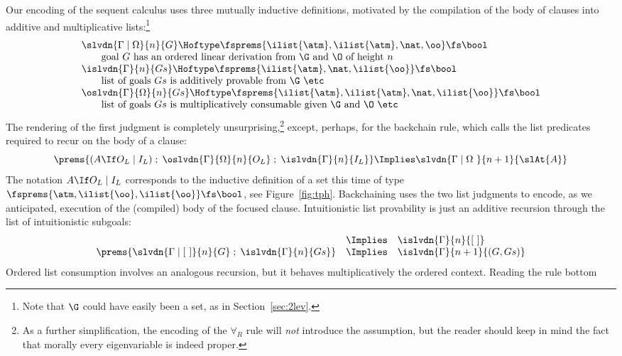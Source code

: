 \documentclass[final]{svjour3}
\begin{document}
Our encoding of the \ollim sequent calculus 
uses three mutually inductive definitions,
motivated by the compilation of the body of clauses into additive and
multiplicative lists:\footnote{Note that $\G$ could have easily been a
set, as in Section~\ref{sec:2lev}.}
\[\begin{array}{l}
  \slvdn{\Gamma\coln\Omega}{n }{G} \Hoftype
  \fsprems{\ilist{\atm},\ilist{\atm}, \nat,\oo}\fs\bool\\
 \qquad\mbox{goal $G$ has an ordered linear derivation from $\G$ and
    $\O$ of height $n$}\\
  \islvdn{\Gamma}{n}{Gs} \Hoftype
  \fsprems{\ilist{\atm}, \nat,\ilist{\oo}}\fs\bool\\
\qquad\mbox{list
    of goals $Gs$ is additively provable from $\G$ \etc}\\  
  \oslvdn{\Gamma}{\Omega}{n}{Gs}\Hoftype
  \fsprems{\ilist{\atm},\ilist{\atm}, \nat,\ilist{\oo}}\fs\bool \\
\qquad\mbox{list of goals $Gs$ is multiplicatively consumable given
    $\G$ and $\O$ \etc}
 \end{array}\]
 The rendering of the first judgment is completely
 unsurprising,\footnote{As a further simplification, the encoding of
   the $\forall_R$ rule will \emph{not} introduce the 
   assumption, but the reader should keep in mind the fact that
   morally every eigenvariable is indeed proper.} except, perhaps, for
 the backchain rule, which calls the list predicates  required to
 recur
  on the body of a clause:
$$
\prems{(\sbc{A}{O_L}{I_L}) \; ;\; \oslvdn{\Gamma}{\Omega}{n}{O_L}\; ;\;
  \islvdn{\Gamma}{n}{I_L}} \Implies \slvdn{\Gamma\coln\Omega\ }{n+1 }{\slAt{A}}
$$ 
The notation $\sbc{A}{O_L}{I_L}$ corresponds to the inductive
definition  of a set  this time of type $\fsprems{\atm,
  \ilist{\oo}, \ilist{\oo}}\fs \bool$, see Figure~\ref{fig:tph}.
Backchaining uses the two list judgments to encode, as we
anticipated,  execution of the
(compiled) body of the focused clause. Intuitionistic list
provability is just an additive recursion through the list of
intuitionistic subgoals:
\[
\begin{array}{rcl}
  & \Implies & \islvdn{\Gamma}{n}{\elist}\\
  \prems{ \slvdn{\Gamma\coln\elist}{n}{G}\; ; \;
  \islvdn{\Gamma}{n}{Gs}}
&\Implies & \islvdn{\Gamma}{n+1}{(G, Gs)}
 \end{array}
\]
Ordered list consumption involves an analogous recursion, but it behaves
multiplicatively \wrt the ordered context. Reading the rule bottom
\end{document}
